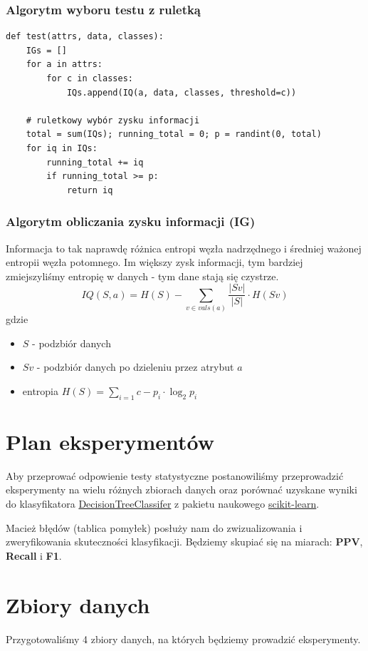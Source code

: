 \documentclass[11pt]{article}
\begin{document}
\subsubsection{Algorytm wyboru testu z ruletką}
\label{sec:orge6811b9}
\begin{verbatim}
def test(attrs, data, classes):
    IGs = []
    for a in attrs:
        for c in classes:
            IQs.append(IQ(a, data, classes, threshold=c))

    # ruletkowy wybór zysku informacji
    total = sum(IQs); running_total = 0; p = randint(0, total)
    for iq in IQs:
        running_total += iq
        if running_total >= p:
            return iq
\end{verbatim}
\subsubsection{Algorytm obliczania zysku informacji (\textbf{IG})}
\label{sec:org5372fdc}
Informacja to tak naprawdę różnica entropi węzła nadrzędnego i średniej ważonej entropii węzła potomnego. Im większy zysk informacji, tym bardziej zmiejszyliśmy entropię w danych - tym dane stają się czystrze.
\[
        IQ(S, a) = H(S) - \sum_{v \in vals(a)}{\frac{|Sv|}{|S|} \cdot H(Sv)}
\]
gdzie
\begin{itemize}
\item \(S\) - podzbiór danych
\item \(Sv\) - podzbiór danych po dzieleniu przez atrybut \(a\)
\item entropia \(H(S) = \sum_{i=1}{c} - p_i \cdot \log_2{p_i}\)
\end{itemize}
\section{Plan eksperymentów}
\label{sec:orgba831bb}
Aby przeprować odpowienie testy statystyczne postanowiliśmy przeprowadzić eksperymenty na wielu różnych zbiorach danych oraz porównać uzyskane wyniki do klasyfikatora \href{https://scikit-learn.org/stable/modules/generated/sklearn.tree.DecisionTreeClassifier.html\#decisiontreeclassifier}{DecisionTreeClassifer} z pakietu naukowego \href{https://scikit-learn.org}{scikit-learn}.

Macież błędów (tablica pomyłek) posłuży nam do zwizualizowania i zweryfikowania skuteczności klasyfikacji. Będziemy skupiać się na miarach: \textbf{PPV}, \textbf{Recall} i \textbf{F1}.

\pagebreak
\section{Zbiory danych}
\label{sec:org34135ba}
Przygotowaliśmy 4 zbiory danych, na których będziemy prowadzić eksperymenty.
\end{document}
